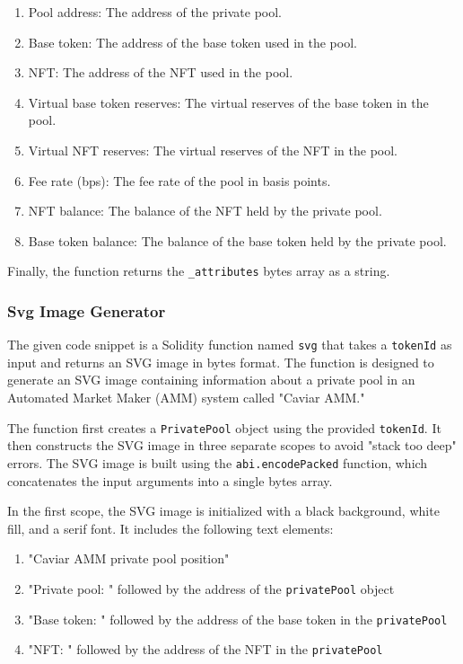 \begin{enumerate}
\def\labelenumi{\arabic{enumi}.}
\tightlist
\item
  Pool address: The address of the private pool.
\item
  Base token: The address of the base token used in the pool.
\item
  NFT: The address of the NFT used in the pool.
\item
  Virtual base token reserves: The virtual reserves of the base token in
  the pool.
\item
  Virtual NFT reserves: The virtual reserves of the NFT in the pool.
\item
  Fee rate (bps): The fee rate of the pool in basis points.
\item
  NFT balance: The balance of the NFT held by the private pool.
\item
  Base token balance: The balance of the base token held by the private
  pool.
\end{enumerate}

Finally, the function returns the \texttt{\_attributes} bytes array as a
string.

\hypertarget{svg-image-generator}{%
\subsubsection{Svg Image Generator}\label{svg-image-generator}}

The given code snippet is a Solidity function named \texttt{svg} that
takes a \texttt{tokenId} as input and returns an SVG image in bytes
format. The function is designed to generate an SVG image containing
information about a private pool in an Automated Market Maker (AMM)
system called "Caviar AMM."

The function first creates a \texttt{PrivatePool} object using the
provided \texttt{tokenId}. It then constructs the SVG image in three
separate scopes to avoid "stack too deep" errors. The SVG image is built
using the \texttt{abi.encodePacked} function, which concatenates the
input arguments into a single bytes array.

In the first scope, the SVG image is initialized with a black
background, white fill, and a serif font. It includes the following text
elements:

\begin{enumerate}
\def\labelenumi{\arabic{enumi}.}
\tightlist
\item
  "Caviar AMM private pool position"
\item
  "Private pool: " followed by the address of the \texttt{privatePool}
  object
\item
  "Base token: " followed by the address of the base token in the
  \texttt{privatePool}
\item
  "NFT: " followed by the address of the NFT in the \texttt{privatePool}
\end{enumerate}

